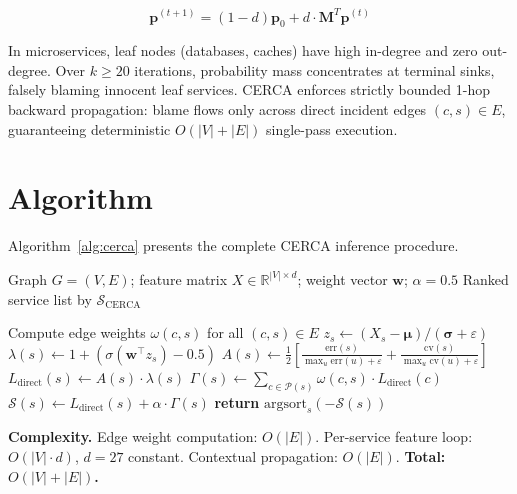 \documentclass[conference]{IEEEtran}
\begin{document}
\begin{equation}
\mathbf{p}^{(t+1)} = (1-d)\mathbf{p}_0 + d \cdot \mathbf{M}^T \mathbf{p}^{(t)}
\end{equation}

In microservices, leaf nodes (databases, caches) have high in-degree and zero out-degree. Over $k \geq 20$ iterations, probability mass concentrates at terminal sinks, falsely blaming innocent leaf services. CERCA enforces strictly bounded 1-hop backward propagation: blame flows only across direct incident edges $(c, s) \in E$, guaranteeing deterministic $O(|V|+|E|)$ single-pass execution.

\section{Algorithm}

Algorithm~\ref{alg:cerca} presents the complete CERCA inference procedure.

\begin{algorithm}[htbp]
\caption{CERCA Root Cause Inference}
\label{alg:cerca}
\begin{algorithmic}[1]
\REQUIRE Graph $G=(V,E)$; feature matrix $X \in \mathbb{R}^{|V| \times d}$; weight vector $\mathbf{w}$; $\alpha = 0.5$
\ENSURE Ranked service list by $\mathcal{S}_{\text{CERCA}}$

\STATE Compute edge weights $\omega(c,s)$ for all $(c,s) \in E$
    \STATE $z_s \leftarrow (X_s - \boldsymbol{\mu}) / (\boldsymbol{\sigma} + \varepsilon)$
    \STATE $\lambda(s) \leftarrow 1 + (\sigma(\mathbf{w}^\top z_s) - 0.5)$
    \STATE $A(s) \leftarrow \frac{1}{2}\left[\frac{\text{err}(s)}{\max_u\text{err}(u)+\varepsilon} + \frac{\text{cv}(s)}{\max_u\text{cv}(u)+\varepsilon}\right]$
    \STATE $L_{\text{direct}}(s) \leftarrow A(s) \cdot \lambda(s)$
\ENDFOR
{}
    \STATE $\Gamma(s) \leftarrow \sum_{c \in \mathcal{P}(s)} \omega(c,s) \cdot L_{\text{direct}}(c)$
    \STATE $\mathcal{S}(s) \leftarrow L_{\text{direct}}(s) + \alpha \cdot \Gamma(s)$
\ENDFOR
\STATE \textbf{return} $\text{argsort}_{s}(-\mathcal{S}(s))$
\end{algorithmic}
\end{algorithm}

\noindent\textbf{Complexity.} Edge weight computation: $O(|E|)$. Per-service feature loop: $O(|V| \cdot d)$, $d=27$ constant. Contextual propagation: $O(|E|)$. \textbf{Total: $O(|V| + |E|)$.}
\end{document}
